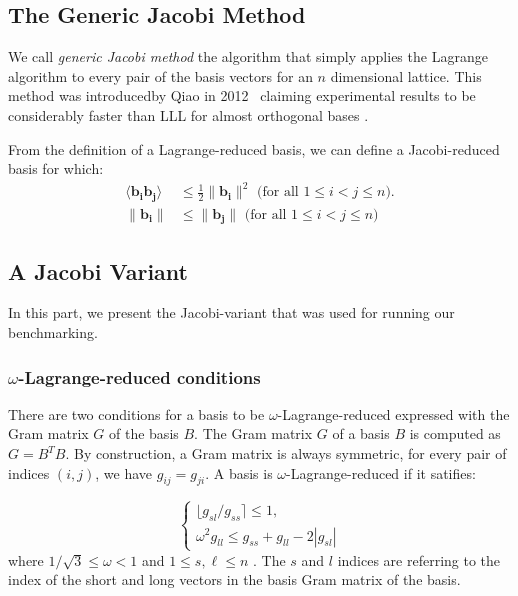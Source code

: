 \documentclass[10pt, a4paper]{article}
\newcommand{\my}[1]{{\color{blue} #1 }}
\renewcommand{\vec}[1]{\mathbf{#1}}
\begin{document}

\subsection{The Generic Jacobi Method}
We call \emph{generic Jacobi method} the algorithm that simply applies the Lagrange algorithm to every pair of the basis vectors for an $n$ dimensional lattice. This method was introducedby Qiao in 2012~\cite{originalJacobiMethodLatticeBasisReduction} claiming experimental results to be considerably faster than LLL \my{for almost orthogonal bases}.

From the definition of a Lagrange-reduced basis, we can define a Jacobi-reduced basis for which:
\begin{align}
\langle \vec{b_i} \vec{b_j} \rangle &\leq \frac{1}{2} \| \vec{b_i}\|^2 \text{ (for all $1 \leq i < j \leq n$)}.\\
\| \vec{b_i}\| &\leq \|\vec{b_j} \| \text{ (for all $1 \leq i < j \leq n$)}
\end{align}




\subsection{A Jacobi Variant}

In this part, we present the Jacobi-variant that was used for running our benchmarking.

\subsubsection{$\omega$-Lagrange-reduced conditions}
There are two conditions for a basis to be $\omega$-Lagrange-reduced expressed with the Gram matrix $G$ of the basis $B$. The Gram matrix $G$ of a basis $B$ is computed \my{as} $G = B^T B$. By construction, a Gram matrix is always symmetric, for every pair of indices $(i,j)$, we have $g_{ij} = g_{ji}$. \my{A basis is $\omega$-Lagrange-reduced if it satifies: }

\[
\begin{cases}
\lfloor g_{sl} / g_{ss} \rceil \leq 1, \\
\omega^2 g_{ll} \leq g_{ss} + g_{ll} - 2|g_{sl}|

\end{cases}
\]  where $1/\sqrt{3} \leq \omega < 1$ \my{and $1\leq s,\ell \leq n $}. The $s$ and $l$ indices are referring to the index of the short and long vectors in the basis Gram matrix of the basis. 
\end{document}
